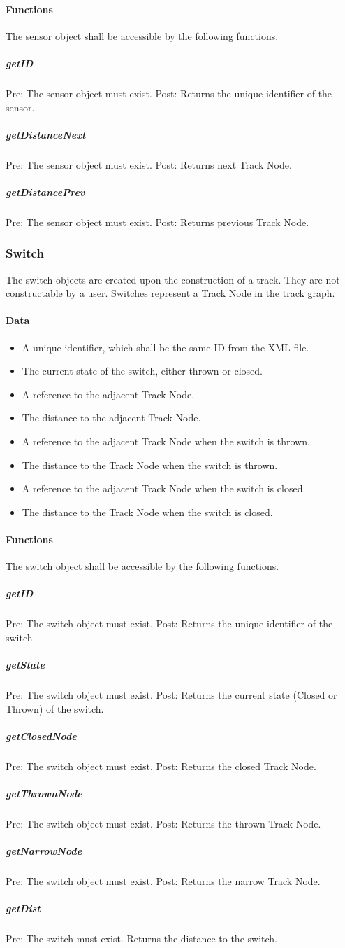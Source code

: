 \documentclass[a4paper,11pt,notitlepage]{article}
\def\TN{Track Node\xspace}
\begin{document}
\paragraph{Functions}
The sensor object shall be accessible by the following functions.
\subparagraph{getID} Pre: The sensor object must exist. Post: Returns the unique identifier of the sensor.
\subparagraph{getDistanceNext} Pre: The sensor object must exist. Post: Returns next \TN.
\subparagraph{getDistancePrev} Pre: The sensor object must exist. Post: Returns previous \TN.

\subsubsection{Switch}
The switch objects are created upon the construction of a track. They are not constructable by a user. Switches represent a \TN in the track graph.
\paragraph{Data}
\begin{itemize}
\item A unique identifier, which shall be the same ID from the XML file.
\item The current state of the switch, either thrown or closed.
\item A reference to the adjacent \TN.
\item The distance to the adjacent \TN.
\item A reference to the adjacent \TN when the switch is thrown.
\item The distance to the \TN when the switch is thrown.
\item A reference to the adjacent \TN when the switch is closed.
\item The distance to the \TN when the switch is closed.
\end{itemize}
\paragraph{Functions}
The switch object shall be accessible by the following functions.
\subparagraph{getID} Pre: The switch object must exist. Post: Returns the unique identifier of the switch.
\subparagraph{getState} Pre: The switch object must exist. Post: Returns the current state (Closed or Thrown) of the switch.
\subparagraph{getClosedNode} Pre: The switch object must exist.  Post: Returns the closed \TN.
\subparagraph{getThrownNode} Pre: The switch object must exist.  Post: Returns the thrown \TN.
\subparagraph{getNarrowNode} Pre: The switch object must exist.  Post: Returns the narrow \TN.
\subparagraph{getDist} Pre: The switch must exist.  Returns the distance to the switch.
\end{document}
